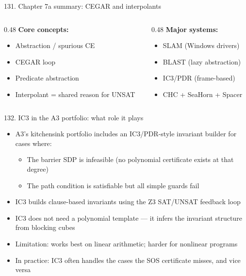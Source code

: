 \documentclass[aspectratio=169]{beamer}
\begin{document}
\begin{frame}{131. Chapter 7a summary: CEGAR and interpolants}
\begin{columns}
\begin{column}{0.48\textwidth}
\textbf{Core concepts:}
\begin{itemize}
  \item Abstraction / spurious CE
  \item CEGAR loop
  \item Predicate abstraction
  \item Interpolant = shared reason for UNSAT
\end{itemize}
\end{column}
\begin{column}{0.48\textwidth}
\textbf{Major systems:}
\begin{itemize}
  \item SLAM (Windows drivers)
  \item BLAST (lazy abstraction)
  \item IC3/PDR (frame-based)
  \item CHC + SeaHorn + Spacer
\end{itemize}
\end{column}
\end{columns}
\end{frame}

\begin{frame}{132. IC3 in the A3 portfolio: what role it plays}
\begin{itemize}
  \item A3's kitchensink portfolio includes an IC3/PDR-style invariant builder for cases where:
    \begin{itemize}
      \item The barrier SDP is infeasible (no polynomial certificate exists at that degree)
      \item The path condition is satisfiable but all simple guards fail
    \end{itemize}
  \item IC3 builds clause-based invariants using the Z3 SAT/UNSAT feedback loop
  \item IC3 does not need a polynomial template --- it infers the invariant structure from blocking cubes
  \item Limitation: works best on linear arithmetic; harder for nonlinear programs
  \item In practice: IC3 often handles the cases the SOS certificate misses, and vice versa
\end{itemize}
\end{frame}
\end{document}
